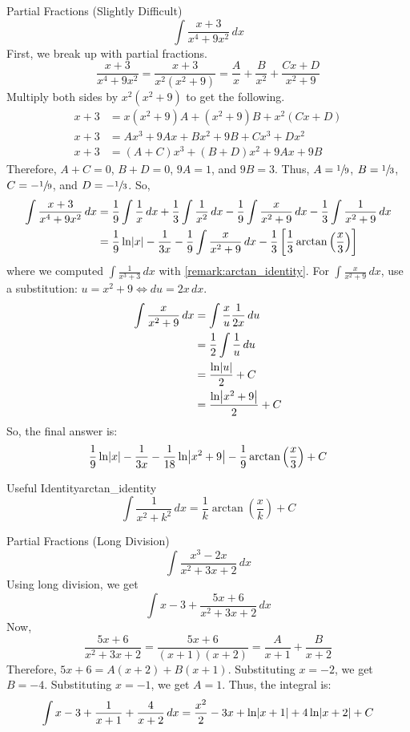 \begin{Example}{Partial Fractions (Slightly Difficult)}{}
    \[ \int \frac{x+3}{x^4+9x^2} \, d{x}  \]
    First, we break up with partial fractions.
    \[ \frac{x+3}{x^4+9x^2} =\frac{x+3}{x^2(x^2+9)}=\frac{A}{x}+\frac{B}{x^2} +\frac{Cx+D}{x^2+9}  \]
    Multiply both sides by $ x^2(x^2+9) $ to get the following.
    \begin{align*}
        x+3 & =x(x^2+9)A+(x^2+9)B+x^2(Cx+D) \\
        x+3 & =Ax^3+9Ax+Bx^2+9B+Cx^3+Dx^2   \\
        x+3 & =(A+C)x^3+(B+D)x^2+9Ax+9B
    \end{align*}
    Therefore, $ A+C=0 $, $ B+D=0 $, $ 9A=1 $, and $ 9B=3 $. Thus,
    $ A=\sfrac{1}{9} $, $ B=\sfrac{1}{3} $, $ C=-\sfrac{1}{9} $,
    and $ D=-\sfrac{1}{3} $. So,
    \begin{align*}
        \int \frac{x+3}{x^4+9x^2} \, d{x}
         & =\frac{1}{9} \int \frac{1}{x} \, d{x} +\frac{1}{3} \int \frac{1}{x^2} \, d{x}
        -\frac{1}{9} \int \frac{x}{x^2+9} \, d{x} -\frac{1}{3} \int \frac{1}{x^2+9} \, d{x} \\
         & =\frac{1}{9}\ln\lvert x\rvert-\frac{1}{3x}-\frac{1}{9} \int \frac{x}{x^2+9}\, d{x}
        -\frac{1}{3} \left[ \frac{1}{3}\arctan\left( \frac{x}{3}  \right) \right]           \\
    \end{align*}
    where we computed $ \int \frac{1}{x^3+3}\,d{x} $ with \cref{remark:arctan_identity}.
    For $ \int \frac{x}{x^2+9} \, d{x}  $, use a substitution: $ u=x^2+9\iff du=2x\,dx $.
    \begin{align*}
        \int \frac{x}{x^2+9} \, d{x}
         & =\int \frac{x}{u} \frac{1}{2x} \, d{u} \\
         & =\frac{1}{2} \int \frac{1}{u} \, d{u}  \\
         & =\frac{\ln\abs{u}}{2} +C               \\
         & =\frac{\ln\abs*{x^2+9}}{2} +C
    \end{align*}
    So, the final answer is:
    \[ \frac{1}{9}\ln\abs{x}-\frac{1}{3x}-\frac{1}{18}\ln\abs*{x^2+9}
        -\frac{1}{9} \arctan\left( \frac{x}{3}  \right)+C \]
\end{Example}

\begin{Remark}{Useful Identity}{arctan_identity}
    \[ \int \frac{1}{x^2+k^2} \, d{x}=\frac{1}{k} \arctan\left( \frac{x}{k}  \right)+C  \]
\end{Remark}

\begin{Example}{Partial Fractions (Long Division)}{}
    \[ \int \frac{x^3-2x}{x^2+3x+2} \, d{x}  \]
    Using long division, we get
    \[ \int x-3+\frac{5x+6}{x^2+3x+2} \, d{x}  \]
    Now,
    \[ \frac{5x+6}{x^2+3x+2} =\frac{5x+6}{(x+1)(x+2)} =\frac{A}{x+1} +\frac{B}{x+2} \]
    Therefore, $ 5x+6=A(x+2)+B(x+1) $. Substituting $ x=-2 $, we get $ B=-4 $.
    Substituting $ x=-1 $, we get $ A=1 $. Thus, the integral is:
    \[ \int x-3+\frac{1}{x+1} +\frac{4}{x+2} \, d{x} =\frac{x^2}{2} -3x+\ln\lvert x+1\rvert
        +4\ln\lvert x+2\rvert+C \]
\end{Example}
